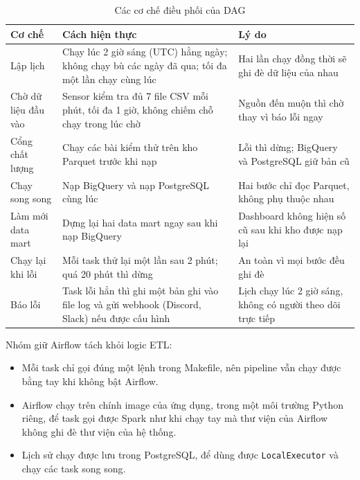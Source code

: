 \begin{table}[htbp]
\centering
\small
\begin{tabularx}{\textwidth}{|p{2.8cm}|X|X|}
\hline
\textbf{Cơ chế} & \textbf{Cách hiện thực} & \textbf{Lý do} \\ \hline
Lập lịch & Chạy lúc 2 giờ sáng (UTC) hằng ngày; không chạy bù các ngày đã qua; tối đa một lần chạy cùng lúc & Hai lần chạy đồng thời sẽ ghi đè dữ liệu của nhau \\ \hline
Chờ dữ liệu đầu vào & Sensor kiểm tra đủ 7 file CSV mỗi phút, tối đa 1 giờ, không chiếm chỗ chạy trong lúc chờ & Nguồn đến muộn thì chờ thay vì báo lỗi ngay \\ \hline
Cổng chất lượng & Chạy các bài kiểm thử trên kho Parquet trước khi nạp & Lỗi thì dừng; BigQuery và PostgreSQL giữ bản cũ \\ \hline
Chạy song song & Nạp BigQuery và nạp PostgreSQL cùng lúc & Hai bước chỉ đọc Parquet, không phụ thuộc nhau \\ \hline
Làm mới data mart & Dựng lại hai data mart ngay sau khi nạp BigQuery & Dashboard không hiện số cũ sau khi kho được nạp lại \\ \hline
Chạy lại khi lỗi & Mỗi task thử lại một lần sau 2 phút; quá 20 phút thì dừng & An toàn vì mọi bước đều ghi đè \\ \hline
Báo lỗi & Task lỗi hẳn thì ghi một bản ghi vào file log và gửi webhook (Discord, Slack) nếu được cấu hình & Lịch chạy lúc 2 giờ sáng, không có người theo dõi trực tiếp \\ \hline
\end{tabularx}
\caption{Các cơ chế điều phối của DAG}
\label{tab:co-che-airflow}
\end{table}

Nhóm giữ Airflow tách khỏi logic ETL:
\begin{itemize}
  \item Mỗi task chỉ gọi đúng một lệnh trong Makefile, nên pipeline vẫn chạy được bằng tay khi
        không bật Airflow.
  \item Airflow chạy trên chính image của ứng dụng, trong một môi trường Python riêng, để task gọi
        được Spark như khi chạy tay mà thư viện của Airflow không ghi đè thư viện của hệ thống.
  \item Lịch sử chạy được lưu trong PostgreSQL, để dùng được \texttt{LocalExecutor} và chạy các
        task song song.
\end{itemize}

